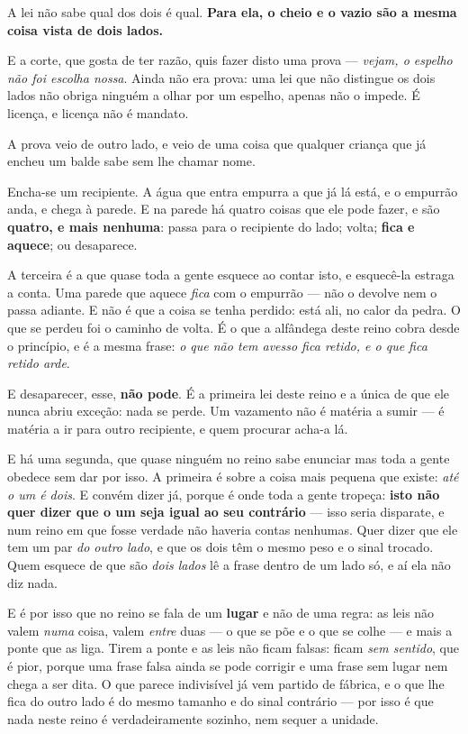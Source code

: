 \documentclass[livro.tex]{subfiles}
\begin{document}
A lei não sabe qual dos dois é qual. \textbf{Para ela, o cheio e o vazio são a mesma coisa
vista de dois lados.}

E a corte, que gosta de ter razão, quis fazer disto uma prova --- \emph{vejam, o espelho não
foi escolha nossa}. Ainda não era prova: uma lei que não distingue os dois lados não obriga
ninguém a olhar por um espelho, apenas não o impede. É licença, e licença não é mandato.

\medskip

A prova veio de outro lado, e veio de uma coisa que qualquer criança que já encheu um balde
sabe sem lhe chamar nome.

Encha-se um recipiente. A água que entra empurra a que já lá está, e o empurrão anda, e
chega à parede. E na parede há quatro coisas que ele pode fazer, e são \textbf{quatro, e mais
nenhuma}: passa para o recipiente do lado; volta; \textbf{fica e aquece}; ou desaparece.

A terceira é a que quase toda a gente esquece ao contar isto, e esquecê-la estraga a conta.
Uma parede que aquece \emph{fica} com o empurrão --- não o devolve nem o passa adiante. E não
é que a coisa se tenha perdido: está ali, no calor da pedra. O que se perdeu foi o caminho de
volta. É o que a alfândega deste reino cobra desde o princípio, e é a mesma frase:
\emph{o que não tem avesso fica retido, e o que fica retido arde}.

E desaparecer, esse, \textbf{não pode}. É a primeira lei deste reino e a única de que ele nunca
abriu exceção: nada se perde. Um vazamento não é matéria a sumir --- é matéria a ir para
outro recipiente, e quem procurar acha-a lá.

E há uma segunda, que quase ninguém no reino sabe enunciar mas toda a gente obedece sem dar
por isso. A primeira é sobre a coisa mais pequena que existe: \emph{até o um é dois}. E convém
dizer já, porque é onde toda a gente tropeça: \textbf{isto não quer dizer que o um seja igual ao
seu contrário} --- isso seria disparate, e num reino em que fosse verdade não haveria contas
nenhumas. Quer dizer que ele tem um par \emph{do outro lado}, e que os dois têm o mesmo peso e o
sinal trocado. Quem esquece de que são \emph{dois lados} lê a frase dentro de um lado só, e aí ela
não diz nada.

E é por isso que no reino se fala de um \textbf{lugar} e não de uma regra: as leis não valem
\emph{numa} coisa, valem \emph{entre} duas --- o que se põe e o que se colhe --- e mais a ponte
que as liga. Tirem a ponte e as leis não ficam falsas: ficam \emph{sem sentido}, que é pior, porque
uma frase falsa ainda se pode corrigir e uma frase sem lugar nem chega a ser dita. O que
parece indivisível já vem partido de fábrica, e o que lhe fica do outro lado é do mesmo
tamanho e do sinal contrário --- por isso é que nada neste reino é verdadeiramente sozinho,
nem sequer a unidade.
\end{document}

